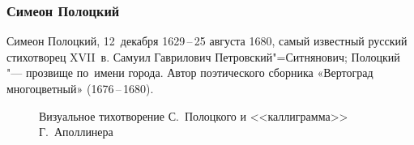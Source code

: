 \documentclass{beamer}
\begin{document}

\begin{frame}
\frametitle{Симеон Полоцкий}
\begin{flushleft}
Симеон Полоцкий, 12~декабря 1629\,--\,25 августа 1680, самый известный русский стихотворец XVII~в. Самуил Гаврилович Петровский"=Ситнянович; Полоцкий "--- прозвище по~имени города. Автор поэтического сборника «Вертоград многоцветный» (1676\,--\,1680).
\end{flushleft}

\begin{figure}[ht]
  \begin{minipage}[ht]{0.49\linewidth}
  \end{minipage}
  \hfill
  \begin{minipage}[ht]{0.49\linewidth}
  \end{minipage}
  \caption{Визуальное тихотворение С.~Полоцкого и <<каллиграмма>> Г.~Аполлинера}
  \label{img:visual}  
\end{figure}

\end{frame}
\end{document}
